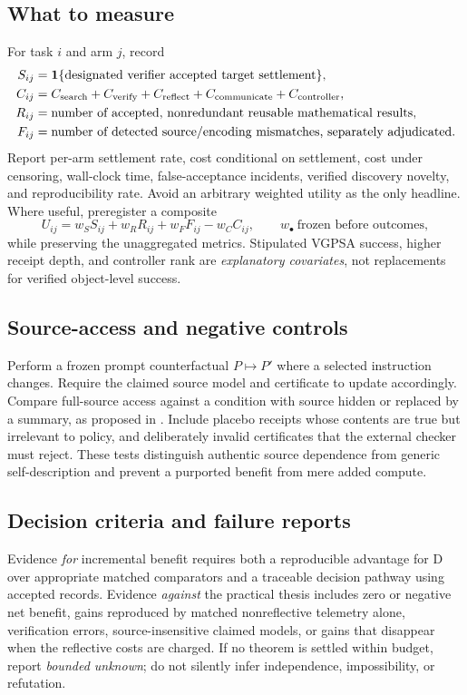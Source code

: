 \documentclass[11pt,letterpaper]{article}
\begin{document}
\subsection{What to measure}
For task $i$ and arm $j$, record
\begin{align*}
S_{ij}&=\mathbf 1\{\text{designated verifier accepted target settlement}\},\\
C_{ij}&=C_{\rm search}+C_{\rm verify}+C_{\rm reflect}+C_{\rm communicate}+C_{\rm controller},\\
R_{ij}&=\text{number of accepted, nonredundant reusable mathematical results},\\
F_{ij}&=\text{number of detected source/encoding mismatches, separately adjudicated}.
\end{align*}
Report per-arm settlement rate, cost conditional on settlement, cost under censoring, wall-clock time, false-acceptance incidents, verified discovery novelty, and reproducibility rate. Avoid an arbitrary weighted utility as the only headline. Where useful, preregister a composite
\[
U_{ij}=w_S S_{ij}+w_RR_{ij}+w_FF_{ij}-w_CC_{ij},\qquad w_\bullet\ \text{frozen before outcomes},
\]
while preserving the unaggregated metrics. Stipulated VGPSA success, higher receipt depth, and controller rank are \emph{explanatory covariates}, not replacements for verified object-level success.

\subsection{Source-access and negative controls}
Perform a frozen prompt counterfactual $P\mapsto P'$ where a selected instruction changes. Require the claimed source model and certificate to update accordingly. Compare full-source access against a condition with source hidden or replaced by a summary, as proposed in \cite{vgpsa}. Include placebo receipts whose contents are true but irrelevant to policy, and deliberately invalid certificates that the external checker must reject. These tests distinguish authentic source dependence from generic self-description and prevent a purported benefit from mere added compute.

\subsection{Decision criteria and failure reports}
Evidence \emph{for} incremental benefit requires both a reproducible advantage for D over appropriate matched comparators and a traceable decision pathway using accepted records. Evidence \emph{against} the practical thesis includes zero or negative net benefit, gains reproduced by matched nonreflective telemetry alone, verification errors, source-insensitive claimed models, or gains that disappear when the reflective costs are charged. If no theorem is settled within budget, report \emph{bounded unknown}; do not silently infer independence, impossibility, or refutation.
\end{document}
